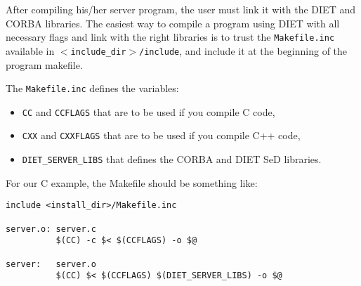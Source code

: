 After compiling his/her server program, the user must link it with the DIET
and CORBA libraries. The easiest way to compile a program using DIET
with all necessary flags and link with the right libraries is to
trust the \texttt{Makefile.inc} available in
\texttt{$<$include\_dir$>$/include}, and include it at the beginning
of the program makefile.

The \texttt{Makefile.inc} defines the variables:
\begin{itemize}
\item \texttt{CC} and \texttt{CCFLAGS} that are to be used if you compile C
 code,
\item \texttt{CXX} and \texttt{CXXFLAGS} that are to be used if you compile C++
  code,
\item \texttt{DIET\_SERVER\_LIBS} that defines the CORBA and DIET SeD libraries.
\end{itemize}

For our C example, the Makefile should be something like:
{\footnotesize
\begin{verbatim}
include <install_dir>/Makefile.inc

server.o: server.c
          $(CC) -c $< $(CCFLAGS) -o $@

server:   server.o
          $(CC) $< $(CCFLAGS) $(DIET_SERVER_LIBS) -o $@
\end{verbatim}
}




